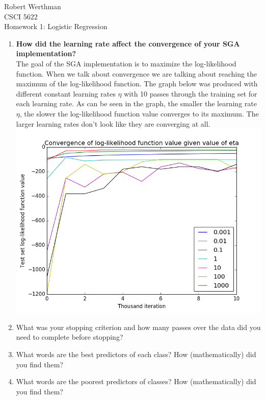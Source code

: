 \documentclass[12pt]{article}
\begin{document}
\noindent
Robert Werthman\\
CSCI 5622\\
Homework 1: Logistic Regression\\

\begin{enumerate}
\item \textbf{How did the learning rate affect the convergence of your SGA implementation?}\\
The goal of the SGA implementation is to maximize the log-likelihood function.  When we talk about convergence we are talking about reaching the maximum of the log-likelihood function.  The graph below was produced with different constant learning rates $\eta$ with 10 passes through the training set for each learning rate.  As can be seen in the graph, the smaller the learning rate $\eta$, the slower the log-likelihood function value converges to its maximum.  The larger learning rates don't look like they are converging at all.\\
\includegraphics[scale=.5]{q1.png}
\item What was your stopping criterion and how many passes over the data did you need to complete before stopping?

\item What words are the best predictors of each class? How (mathematically) did you find them?

\item What words are the poorest predictors of classes? How (mathematically) did you find them?

\end{enumerate}
\end{document}
